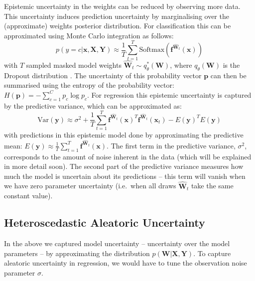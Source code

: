 \documentclass{article}
\newcommand{\softmax}{\text{Softmax}}
\newcommand{\f}{\mathbf{f}}
\newcommand{\x}{\mathbf{x}}
\newcommand{\y}{\mathbf{y}}
\newcommand{\W}{\mathbf{W}}
\newcommand{\X}{\mathbf{X}}
\newcommand{\Y}{\mathbf{Y}}
\newcommand{\p}{\mathbf{p}}
\newcommand{\Wh}{{\widehat{\mathbf{W}}}}
\begin{document}
Epistemic uncertainty in the weights can be reduced by observing more data. This uncertainty induces prediction uncertainty by marginalising over the (approximate) weights posterior distribution. For classification this can be approximated using Monte Carlo integration as follows:
\begin{equation}
p(y=c | \x, \X, \Y) 
\approx
\frac{1}{T} \sum_{t=1}^T \softmax(\f^{\Wh_t}(\x))
\end{equation}
with $T$ sampled masked model weights $\Wh_t \sim q_\theta^*(\W)$, where $q_\theta(\W)$ is the Dropout distribution \citep{gal2016thesis}. 
The uncertainty of this probability vector $\p$ can then be summarised using the entropy of the probability vector:
$H(\p) = - \sum_{c=1}^C p_c \log p_c.$
For regression this epistemic uncertainty is captured by the predictive variance, which can be approximated as:
\begin{equation}
\text{Var}(\y) \approx \sigma^2 + \frac{1}{T} \sum_{t=1}^T \f^{\Wh_t}(\x)^T \f^{\Wh_t}(\x_t) - E(\y)^T E(\y)
\end{equation}
with predictions in this epistemic model done by approximating the predictive mean: 
$E(\y) \approx \frac{1}{T} \sum_{t=1}^T \f^{\Wh_t}(\x).$
The first term in the predictive variance, $\sigma^2$, corresponds to the amount of noise inherent in the data (which will be explained in more detail soon). The second part of the predictive variance measures how much the model is uncertain about its predictions -- this term will vanish when we have zero parameter uncertainty (i.e.\ when all draws $\Wh_t$ take the same constant value). 

\subsection{Heteroscedastic Aleatoric Uncertainty}
\label{sect:hetero}

In the above we captured model uncertainty -- uncertainty over the model parameters -- by approximating the distribution $p(\W | \X, \Y)$. To capture aleatoric uncertainty in regression, we would have to tune the observation noise parameter $\sigma$.
\end{document}
